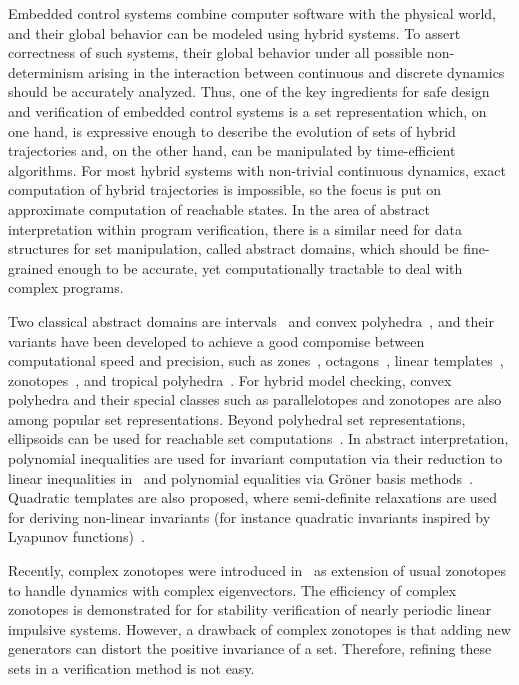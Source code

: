 Embedded control systems combine computer software with the physical
world, and their global behavior can be modeled using hybrid systems.
To assert correctness of such systems, their global behavior under all
possible non-determinism arising in the interaction between continuous
and discrete dynamics should be accurately analyzed. Thus, one of the
key ingredients for safe design and verification of embedded control
systems is a set representation which, on one hand, is expressive
enough to describe the evolution of sets of hybrid trajectories and,
on the other hand, can be manipulated by time-efficient
algorithms. For most hybrid systems with non-trivial continuous
dynamics, exact computation of hybrid trajectories is impossible, so
the focus is put on approximate computation of reachable states. In
the area of abstract interpretation within program verification, there
is a similar need for data structures for set manipulation, called
abstract domains, which should be fine-grained enough to be accurate,
yet computationally tractable to deal with complex programs.

 
Two classical abstract domains are intervals~\cite{CousotCousot76-1}
and convex polyhedra~\cite{DBLP:conf/popl/CousotH78}, and their
variants have been developed to achieve a good compomise between
computational speed and precision, such as
zones~\cite{DBLP:conf/pado/Mine01},
octagons~\cite{DBLP:journals/lisp/Mine06}, linear
templates~\cite{VMCAI05}, zonotopes~\cite{HSCC05}, and tropical
polyhedra~\cite{DBLP:conf/sas/AllamigeonGG08}. For hybrid model
checking, convex polyhedra and their special classes such as
parallelotopes and zonotopes are also among popular set
representations.  Beyond polyhedral set representations, ellipsoids
can be used for reachable set computations~\cite{KurzhanskiVaraiya00}.
In abstract interpretation, polynomial inequalities are used for
invariant computation via their reduction to linear inequalities
in~\cite{bagrodzafSAS05} and polynomial equalities via Gr\"{o}ner
basis methods~\cite{Rodriguez-Carbonell:2007}. Quadratic templates are
also proposed, where semi-definite relaxations are used for deriving
non-linear invariants (for instance quadratic invariants inspired by
Lyapunov functions)~\cite{Feron2010,AdjeGaubertGoubaultESOP2010}.

Recently, complex zonotopes were introduced in~\cite{arvind2016lis} as
extension of usual zonotopes to handle dynamics with complex
eigenvectors.  The efficiency of complex zonotopes is demonstrated for
for stability verification of nearly periodic linear impulsive
systems. However, a drawback of complex zonotopes is that adding new
generators can distort the positive invariance of a set.  Therefore,
refining these sets in a verification method is not easy.
 


